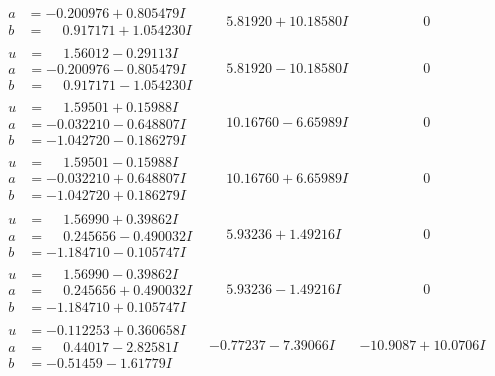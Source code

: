 \documentclass[1p]{elsarticle_modified}
\theoremstyle{definition}
\begin{document}
$$\begin{array}{c|c|c}
\begin{aligned}
a &= -0.200976 + 0.805479 I \\
b &= \phantom{-}0.917171 + 1.054230 I\end{aligned}
 & \phantom{-}5.81920 + 10.18580 I & \phantom{-0.000000 } 0 \\ \hline\begin{aligned}
u &= \phantom{-}1.56012 - 0.29113 I \\
a &= -0.200976 - 0.805479 I \\
b &= \phantom{-}0.917171 - 1.054230 I\end{aligned}
 & \phantom{-}5.81920 - 10.18580 I & \phantom{-0.000000 } 0 \\ \hline\begin{aligned}
u &= \phantom{-}1.59501 + 0.15988 I \\
a &= -0.032210 - 0.648807 I \\
b &= -1.042720 - 0.186279 I\end{aligned}
 & \phantom{-}10.16760 - 6.65989 I & \phantom{-0.000000 } 0 \\ \hline\begin{aligned}
u &= \phantom{-}1.59501 - 0.15988 I \\
a &= -0.032210 + 0.648807 I \\
b &= -1.042720 + 0.186279 I\end{aligned}
 & \phantom{-}10.16760 + 6.65989 I & \phantom{-0.000000 } 0 \\ \hline\begin{aligned}
u &= \phantom{-}1.56990 + 0.39862 I \\
a &= \phantom{-}0.245656 - 0.490032 I \\
b &= -1.184710 - 0.105747 I\end{aligned}
 & \phantom{-}5.93236 + 1.49216 I & \phantom{-0.000000 } 0 \\ \hline\begin{aligned}
u &= \phantom{-}1.56990 - 0.39862 I \\
a &= \phantom{-}0.245656 + 0.490032 I \\
b &= -1.184710 + 0.105747 I\end{aligned}
 & \phantom{-}5.93236 - 1.49216 I & \phantom{-0.000000 } 0 \\ \hline\begin{aligned}
u &= -0.112253 + 0.360658 I \\
a &= \phantom{-}0.44017 - 2.82581 I \\
b &= -0.51459 - 1.61779 I\end{aligned}
 & -0.77237 - 7.39066 I & -10.9087 + 10.0706 I \\ \hline\begin{aligned}

\end{aligned}
\end{array}$$
\end{document}
